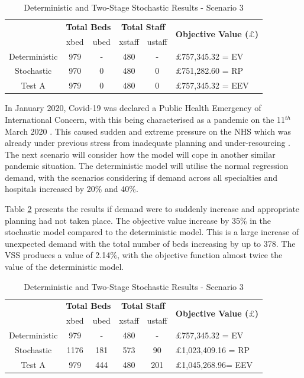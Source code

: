 \documentclass[../thesis.tex]{subfiles}
\begin{document}
\begin{table}[h!]
    \centering
    \begin{tabular}{cccccl}\toprule
 & \multicolumn{2}{l}{\textbf{Total Beds}} & \multicolumn{2}{c}{\textbf{Total Staff}} & \multirow{2}{*}{\textbf{Objective Value ($\pounds$)}}\\ \cmidrule(lr){2-3} \cmidrule(lr){4-5}
         
 & xbed           & ubed          & xstaff         & ustaff         \\ \midrule
 Deterministic & 979  & - & 480 & - &$\pounds$757,345.32 = EV \\
 Stochastic & 970 & 0 & 480 & 0 & $\pounds$751,282.60 = RP \\
 Test A & 979 & 0 & 480 & 0 & $\pounds$757,345.32 = EEV \\\bottomrule
    \end{tabular}
    \caption{Deterministic and Two-Stage Stochastic Results - Scenario 3}
    \label{tab:Scenario6Results}
\end{table}

In January 2020, Covid-19 was declared a Public Health Emergency of International Concern, with this being characterised as a pandemic on the 11$^{th}$ March 2020 \cite{WHO2023}. This caused sudden and extreme pressure on the NHS which was already under previous stress from inadequate planning and under-resourcing \cite{BMA2022}. The next scenario will consider how the model will cope in another similar pandemic situation. The deterministic model will utilise the normal regression demand, with the scenarios considering if demand across all specialties and hospitals increased by 20\% and 40\%.

Table \ref{tab:Scenario7Results} presents the results if demand were to suddenly increase and appropriate planning had not taken place. The objective value increase by 35\% in the stochastic model compared to the deterministic model. This is a large increase of unexpected demand with the total number of beds increasing by up to 378. The VSS produces a value of 2.14\%, with the objective function almost twice the value of the deterministic model. 
\begin{table}[h!]
    \centering
    \begin{tabular}{cccccl}\toprule
 & \multicolumn{2}{l}{\textbf{Total Beds}} & \multicolumn{2}{c}{\textbf{Total Staff}} & \multirow{2}{*}{\textbf{Objective Value ($\pounds$)}}\\ \cmidrule(lr){2-3} \cmidrule(lr){4-5}
         
 & xbed           & ubed          & xstaff         & ustaff         \\ \midrule
 Deterministic & 979  & - & 480 & - &$\pounds$757,345.32 = EV \\
 Stochastic & 1176 & 181 & 573 & 90 & $\pounds$1,023,409.16 = RP \\
 Test A & 979 & 444 & 480 & 201 & $\pounds$1,045,268.96= EEV \\\bottomrule
    \end{tabular}
    \caption{Deterministic and Two-Stage Stochastic Results - Scenario 3}
    \label{tab:Scenario7Results}
\end{table}
\end{document}

